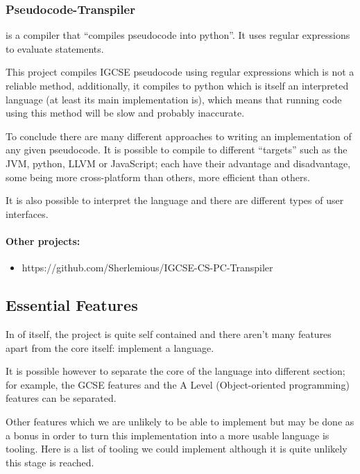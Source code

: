 \documentclass{article}
\begin{document}
\subsubsection{Pseudocode-Transpiler}

\Textcite{pseudocode-transpiler} is a compiler that ``compiles pseudocode into
python''. It uses regular expressions to evaluate statements.

This project compiles IGCSE pseudocode using regular expressions which is not a
reliable method, additionally, it compiles to python which is itself an
interpreted language (at least its main implementation is), which means that
running code using this method will be slow and probably inaccurate.

To conclude there are many different approaches to writing an implementation of
any given pseudocode. It is possible to compile to different ``targets'' such
as the JVM, python, LLVM or JavaScript; each have their advantage and
disadvantage, some being more cross-platform than others, more efficient than
others.

It is also possible to interpret the language and there are different types of
user interfaces.

\paragraph{Other projects:}

\begin{itemize}
    \item{https://github.com/Sherlemious/IGCSE-CS-PC-Transpiler}
\end{itemize}

\subsection{Essential Features}


In of itself, the project is quite self contained and there aren't many
features apart from the core itself: implement a language.

It is possible however to separate the core of the language into different
section; for example, the GCSE features and the A Level (Object-oriented
programming) features can be separated.

Other features which we are unlikely to be able to implement but may be done as
a bonus in order to turn this implementation into a more usable language is
tooling. Here is a list of tooling we could implement although it is quite
unlikely this stage is reached.
\end{document}
